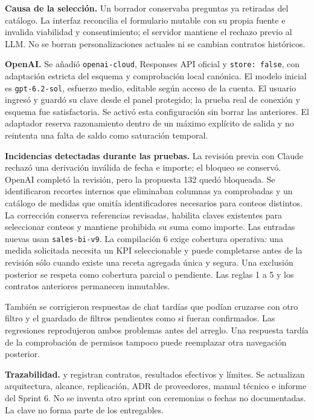 \documentclass[11pt,letterpaper]{article}
\newcommand{\file}[1]{\texttt{#1}}
\begin{document}
\textbf{Causa de la selección.} Un borrador conservaba preguntas ya retiradas del
catálogo. La interfaz reconcilia el formulario mutable con su propia fuente e
invalida viabilidad y consentimiento; el servidor mantiene el rechazo previo al
LLM. No se borran personalizaciones actuales ni se cambian contratos históricos.

\textbf{OpenAI.} Se añadió \file{openai-cloud}, Responses API oficial y
\file{store: false}, con adaptación estricta del esquema y comprobación local
canónica. El modelo inicial es \file{gpt-6.2-sol}, esfuerzo medio, editable según
acceso de la cuenta. El usuario ingresó y guardó su clave desde el panel protegido;
la prueba real de conexión y esquema fue satisfactoria. Se activó esta configuración
sin borrar las anteriores. El adaptador reserva razonamiento dentro de un máximo
explícito de salida y no reintenta una falta de saldo como saturación temporal.

\textbf{Incidencias detectadas durante las pruebas.} La revisión previa con Claude
rechazó una derivación inválida de fecha e importe; el bloqueo se conservó. OpenAI
completó la revisión, pero la propuesta 132 quedó bloqueada. Se identificaron
recortes internos que eliminaban columnas ya comprobadas y un catálogo de medidas
que omitía identificadores necesarios para conteos distintos. La corrección
conserva referencias revisadas, habilita claves existentes para seleccionar conteos
y mantiene prohibida su suma como importe. Las entradas nuevas usan
\file{sales-bi-v9}. La compilación 6 exige cobertura operativa: una medida
solicitada necesita un KPI seleccionable y puede completarse antes de la revisión
sólo cuando existe una receta agregada única y segura. Una exclusión posterior
se respeta como cobertura parcial o pendiente. Las reglas 1 a 5 y los contratos
anteriores permanecen inmutables.

También se corrigieron respuestas de chat tardías que podían cruzarse con otro
filtro y el guardado de filtros pendientes como si fueran confirmados. Las
regresiones reprodujeron ambos problemas antes del arreglo. Una respuesta tardía de
la comprobación de permisos tampoco puede reemplazar otra navegación posterior.

\textbf{Trazabilidad.} 
y  registran contratos,
resultados efectivos y límites. Se actualizan arquitectura, alcance, replicación,
ADR de proveedores, manual técnico e informe del Sprint 6. No se inventa otro sprint
con ceremonias o fechas no documentadas. La clave no forma parte de los entregables.
\end{document}
